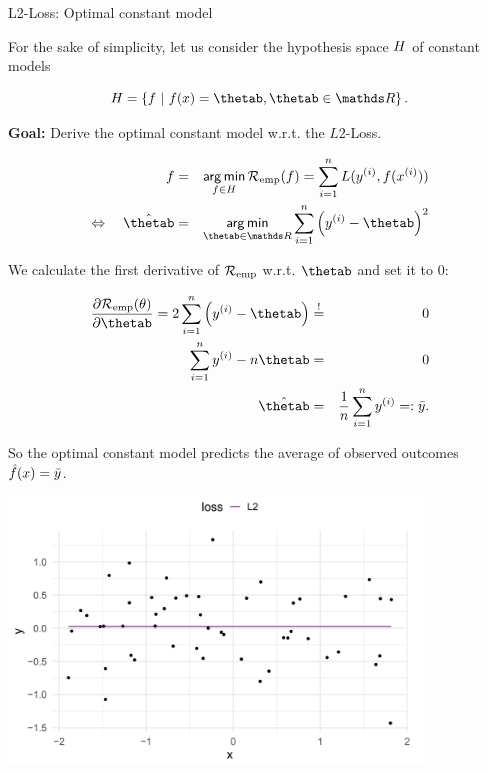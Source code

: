 \begin{vbframe}{L2-Loss: Optimal constant model}


For the sake of simplicity, let us consider the hypothesis space $H$ of constant models 

$$
\Hspace = \left\{f~|~\fx = \thetab, \thetab\in \R \right\}.
$$

\textbf{Goal:} Derive the optimal constant model w.r.t. the $L2$-Loss. 

\begin{eqnarray*}
f &=& \argmin_{f \in \Hspace} \riskef = \sumin \Lxyi\\
\Leftrightarrow \quad \hat \thetab&=& \argmin_{\thetab\in \R} \sum_{i = 1}^n \left(\yi - \thetab\right)^2
\end{eqnarray*}

\framebreak

We calculate the first derivative of $\mathcal{R}_{\text{emp}}$ w.r.t. $\thetab$ and set it to $0$: 


\begin{eqnarray*}
\frac{\partial \risket}{\partial \thetab} = 2 \sumin \left(\yi - \thetab\right) &\overset{!}{=}& 0 \\
\sumin \yi - n \thetab&=& 0 \\
\hat \thetab&=& \frac{1}{n} \sumin \yi =: \bar y.
\end{eqnarray*}

So the optimal constant model predicts the average of observed outcomes $\hat{f}(x) = \bar y$.

\framebreak



\begin{center}
\includegraphics[width = 11cm ]{figure_man/L2-loss.png} \\
\end{center}


\end{vbframe}


